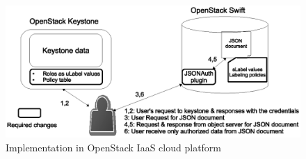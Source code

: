  
 	\begin{figure} [t]
 		\centering
 		\includegraphics[width=.9\textwidth]{NSS16/implementation-in-swift}
 		\caption{Implementation in OpenStack IaaS cloud platform}
 		\label{fig:implementation-in-swift-a}
 	\end{figure}
 